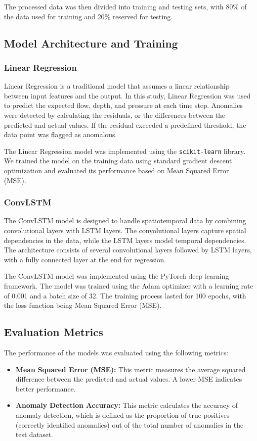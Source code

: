 \documentclass[conference]{IEEEtran}
\begin{document}
The processed data was then divided into training and testing sets, with 80\% of the data used for training and 20\% reserved for testing.

\subsection{Model Architecture and Training}
\subsubsection{Linear Regression}
Linear Regression is a traditional model that assumes a linear relationship between input features and the output. In this study, Linear Regression was used to predict the expected flow, depth, and pressure at each time step. Anomalies were detected by calculating the residuals, or the differences between the predicted and actual values. If the residual exceeded a predefined threshold, the data point was flagged as anomalous.

The Linear Regression model was implemented using the \texttt{scikit-learn} library. We trained the model on the training data using standard gradient descent optimization and evaluated its performance based on Mean Squared Error (MSE).

\subsubsection{ConvLSTM}
The ConvLSTM model is designed to handle spatiotemporal data by combining convolutional layers with LSTM layers. The convolutional layers capture spatial dependencies in the data, while the LSTM layers model temporal dependencies. The architecture consists of several convolutional layers followed by LSTM layers, with a fully connected layer at the end for regression.

The ConvLSTM model was implemented using the PyTorch deep learning framework. The model was trained using the Adam optimizer with a learning rate of 0.001 and a batch size of 32. The training process lasted for 100 epochs, with the loss function being Mean Squared Error (MSE).

\subsection{Evaluation Metrics}
The performance of the models was evaluated using the following metrics:
\begin{itemize}
    \item \textbf{Mean Squared Error (MSE):} This metric measures the average squared difference between the predicted and actual values. A lower MSE indicates better performance.
    \item \textbf{Anomaly Detection Accuracy:} This metric calculates the accuracy of anomaly detection, which is defined as the proportion of true positives (correctly identified anomalies) out of the total number of anomalies in the test dataset.
\end{itemize}
\end{document}
